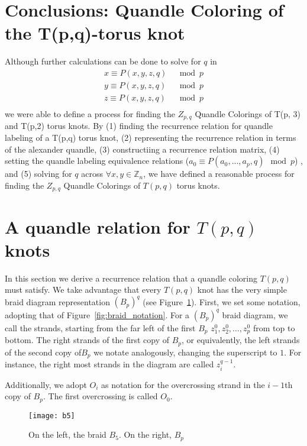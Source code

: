 \documentclass[paper.tex]{subfiles}
\begin{document}
\section{Conclusions: Quandle Coloring of the T(p,q)-torus knot}\label{sec:pntorus}
Although further calculations can be done to solve for $q$ in
\begin{align*}
	x \equiv P(x,y,z,q) & \mod{p} \\
	y \equiv P(x,y,z,q) & \mod{p} \\
	z \equiv P(x,y,z,q) & \mod{p} \\
\end{align*}
we were able to define a process for finding the $Z_{p,q}$ Quandle Colorings of T(p, 3) and T(p,2) torus knots. By (1) finding the recurrence relation for quandle labeling of a T(p,q) torus knot, (2) representing the recurrence relation in terms of the alexander quandle, (3) constructiing a recurrence relation matrix,  (4) setting the quandle labeling equivalence relations ($a_{0} \equiv P(a_{0},...,a_{p},q) \mod{p}$) , and (5) solving for $q$ across $\forall x,y \in \mathbb{Z}_n$, we have defined a reasonable process for finding the $Z_{p,q}$ Quandle Colorings of $T(p,q)$ torus knots.

\section{A quandle relation for $T(p,q)$ knots}

In this section we derive a recurrence relation that a quandle coloring $T(p,q)$ must satisfy. We take advantage that every $T(p,q)$ knot has the very simple braid diagram representation $(B_p)^q$ (see Figure~\ref{fig:bp}). First,
we set some notation, adopting that of Figure~\ref{fig:braid_notation}. For a $(B_p)^q$ braid diagram, we call the strands, starting from the far left of the first $B_p$ $z^0_1, z^0_2, \ldots, z^0_p$ from top to bottom.
The right strands of the first copy of $B_p$, or equivalently, the left strands of the second copy of$B_p$ we notate analogously, changing the superscript to $1$. For instance, the right most strands in the diagram are called $z^{q - 1}_i$.

Additionally, we adopt $O_i$ as notation for the overcrossing strand in the $i - 1$th copy of $B_p$. The first overcrossing is called $O_0$.

\begin{figure}[h]
  \centering
  \texttt{[image: b5]}
  \caption{On the left, the braid $B_5$. On the right, $B_p$}\label{fig:bp}
\end{figure}
\end{document}
